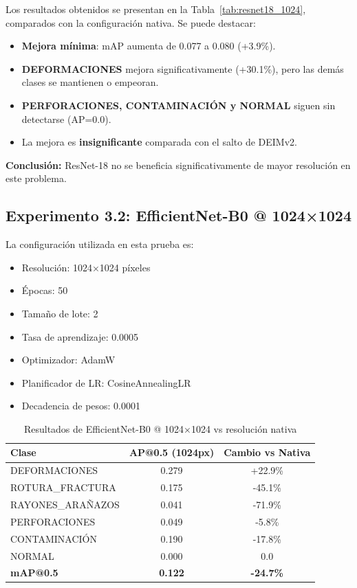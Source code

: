 Los resultados obtenidos se presentan en la Tabla~\ref{tab:resnet18_1024}, comparados con la configuración nativa. Se puede destacar:
\begin{itemize}
    \item \textbf{Mejora mínima}: mAP aumenta de 0.077 a 0.080 (+3.9\%).
    \item \textbf{DEFORMACIONES} mejora significativamente (+30.1\%), pero las demás clases se mantienen o empeoran.
    \item \textbf{PERFORACIONES, CONTAMINACIÓN y NORMAL} siguen sin detectarse (AP=0.0).
    \item La mejora es \textbf{insignificante} comparada con el salto de DEIMv2.
\end{itemize}

\textbf{Conclusión:} ResNet-18 no se beneficia significativamente de mayor resolución en este problema.

\subsection{Experimento 3.2: EfficientNet-B0 @ 1024×1024}

La configuración utilizada en esta prueba es:
\begin{itemize}
    \item Resolución: 1024×1024 píxeles
    \item Épocas: 50
    \item Tamaño de lote: 2
    \item Tasa de aprendizaje: 0.0005
    \item Optimizador: AdamW
    \item Planificador de LR: CosineAnnealingLR
    \item Decadencia de pesos: 0.0001
\end{itemize}

\begin{table}[htbp]
\centering
\begin{tabular}{lcc}
\toprule
\textbf{Clase} & \textbf{AP@0.5 (1024px)} & \textbf{Cambio vs Nativa} \\
\midrule
DEFORMACIONES & 0.279 & +22.9\% \\
\mbox{ROTURA\_FRACTURA} & 0.175 & -45.1\% \\
\mbox{RAYONES\_ARAÑAZOS} & 0.041 & -71.9\% \\
PERFORACIONES & 0.049 & -5.8\% \\
CONTAMINACIÓN & 0.190 & -17.8\% \\
NORMAL & 0.000 & 0.0 \\
\midrule
\textbf{mAP@0.5} & \textbf{0.122} & \textbf{-24.7\%} \\
\bottomrule
\end{tabular}
\caption{Resultados de EfficientNet-B0 @ 1024×1024 vs resolución nativa}
\label{tab:efficientnet_1024}
\end{table}


